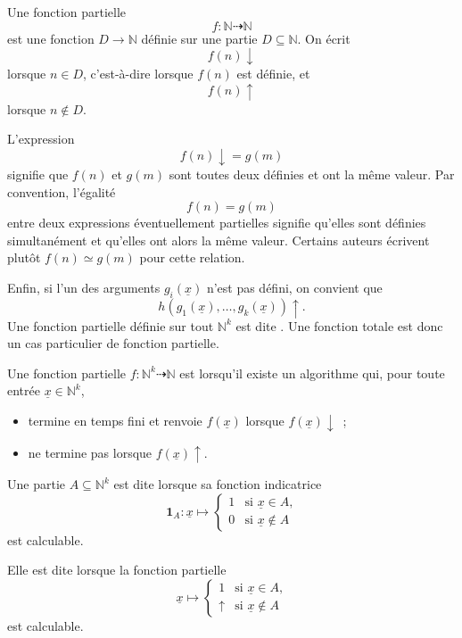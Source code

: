Une fonction partielle
\[
f\colon\mathbb{N}\dasharrow\mathbb{N}
\]
est une fonction $D\to\mathbb{N}$ définie sur une partie
$D\subseteq\mathbb{N}$.  On écrit
\[
f(n)\downarrow
\]
lorsque $n\in D$, c'est-à-dire lorsque $f(n)$ est définie, et
\[
f(n)\uparrow
\]
lorsque $n\notin D$.

L'expression
\[
f(n)\downarrow=g(m)
\]
signifie que $f(n)$ et $g(m)$ sont toutes deux définies et ont la même
valeur.  Par convention, l'égalité
\[
f(n)=g(m)
\]
entre deux expressions éventuellement partielles signifie qu'elles
sont définies simultanément et qu'elles ont alors la même valeur.
Certains auteurs écrivent plutôt $f(n)\simeq g(m)$ pour cette relation.

Enfin, si l'un des arguments $g_i(\underline{x})$ n'est pas défini, on
convient que
\[
h(g_1(\underline{x}),\ldots,g_k(\underline{x}))\uparrow.
\]
Une fonction partielle définie sur tout $\mathbb{N}^k$ est dite
.  Une fonction totale est donc un cas
particulier de fonction partielle.

\begin{defn}\label{definition-computable-partial-function}
Une fonction partielle
$f\colon\mathbb{N}^k\dasharrow\mathbb{N}$ est
 lorsqu'il existe un algorithme
qui, pour toute entrée $\underline{x}\in\mathbb{N}^k$,
\begin{itemize}
\item termine en temps fini et renvoie $f(\underline{x})$ lorsque
  $f(\underline{x})\downarrow$ ;
\item ne termine pas lorsque $f(\underline{x})\uparrow$.
\end{itemize}
\end{defn}

\begin{defn}\label{definition-decidable-semidecidable}
Une partie $A\subseteq\mathbb{N}^k$ est dite
 lorsque sa fonction indicatrice
\[
\mathbf{1}_A\colon\underline{x}\mapsto
\begin{cases}
1&\text{si $\underline{x}\in A$,}\\
0&\text{si $\underline{x}\notin A$}
\end{cases}
\]
est calculable.

Elle est dite  lorsque la fonction partielle
\[
\underline{x}\mapsto
\begin{cases}
1&\text{si $\underline{x}\in A$,}\\
\uparrow&\text{si $\underline{x}\notin A$}
\end{cases}
\]
est calculable.
\end{defn}


